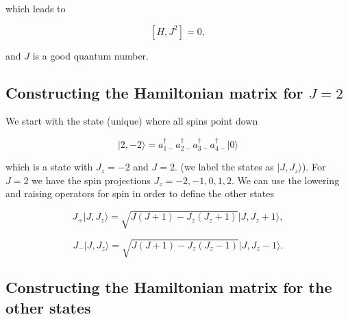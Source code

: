 \documentclass[11pt]{article}
\begin{document}
    which leads to

    \hypertarget{eq:kHJ2}{}

\[
\begin{equation}
[H,J^2] = 0,
\label{eq:kHJ2} \tag{17}
\end{equation}
\]

    and \(J\) is a good quantum number.

    \hypertarget{constructing-the-hamiltonian-matrix-for-j2}{%
\subsection{\texorpdfstring{Constructing the Hamiltonian matrix for
\(J=2\)}{Constructing the Hamiltonian matrix for J=2}}\label{constructing-the-hamiltonian-matrix-for-j2}}

We start with the state (unique) where all spins point down

    \hypertarget{eq:2ux2c-2}{}

\[
\begin{equation}
\vert 2,-2\rangle = a_{1-}^{\dagger} a_{2-}^{\dagger}
a_{3-}^{\dagger} a_{4-}^{\dagger} \vert 0\rangle
\label{eq:2,-2} \tag{18}
\end{equation}
\]

    which is a state with \(J_z = -2\) and \(J = 2\). (we label the states
as \(\vert J,J_z\rangle\)). For \(J = 2\) we have the spin projections
\(J_z = -2,-1,0,1,2\). We can use the lowering and raising operators for
spin in order to define the other states

    \hypertarget{eq:J+ket}{}

\[
\begin{equation}
J_+ \vert J,J_z\rangle = \sqrt{J(J+1) - J_z(J_z + 1)} \vert J,J_z + 1\rangle,
\label{eq:J+ket} \tag{19} 
\end{equation}
\]

    \hypertarget{eq:J-ket}{}

\[
\begin{equation} 
J_- \vert J,J_z\rangle = \sqrt{J(J+1) - J_z(J_z - 1)} \vert J,J_z - 1\rangle.
\label{eq:J-ket} \tag{20}
\end{equation}
\]

    \hypertarget{constructing-the-hamiltonian-matrix-for-the-other-states}{%
\subsection{Constructing the Hamiltonian matrix for the other
states}\label{constructing-the-hamiltonian-matrix-for-the-other-states}}
\end{document}
